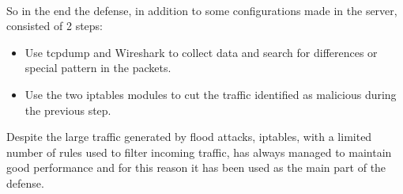 \documentclass[14pt]{article}
\begin{document}
\\
So in the end the defense, in addition to some configurations made in the server, consisted of 2 steps:
\begin{itemize}
	\item Use tcpdump and Wireshark to collect data and search for differences or special pattern in the packets.
	\item Use the two iptables modules to cut the traffic identified as malicious during the previous step.
\end{itemize}

Despite the large traffic generated by flood attacks, iptables, with a limited number of rules used to filter incoming traffic, has always managed to maintain good performance and for this reason it has been used as the main part of the defense.
\end{document}
